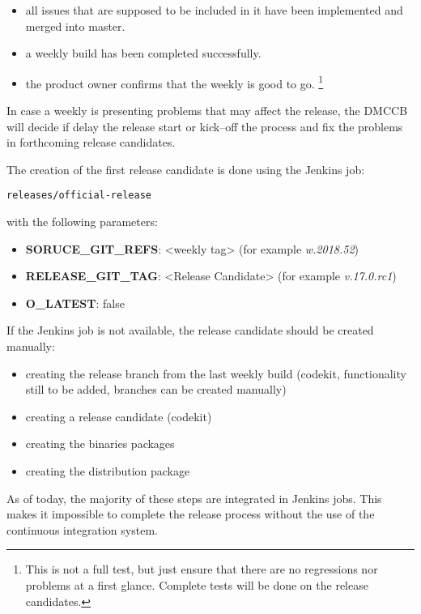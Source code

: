 \begin{itemize}
\item all issues that are supposed to be included in it have been implemented and merged into master.
\item a weekly build has been completed successfully.
\item the product owner confirms that the weekly is good to go. \footnote{This is not a full test, but just ensure that there are no regressions nor problems at a first glance. Complete tests will be done on the release candidates.}
\end{itemize}

In case a weekly is presenting problems that may affect the release, the DMCCB will decide if delay the release start or kick--off the process and fix the problems in forthcoming release candidates.

The creation of the first release candidate is done using the Jenkins job:

\begin{verbatim}
releases/official-release
\end{verbatim}

with the following parameters:

\begin{itemize}
\item {\bf SORUCE\_GIT\_REFS}: <weekly tag> (for example \textit{w.2018.52})
\item {\bf RELEASE\_GIT\_TAG}: <Release Candidate> (for example \textit{v.17.0.rc1})
\item {\bf O\_LATEST}: false
\end{itemize}


If the Jenkins job is not available, the release candidate should be created manually:

\begin{itemize}
\item creating the release branch from the last weekly build (codekit, functionality still to be added, branches can be created manually)
\item creating a release candidate (codekit)
\item creating the binaries packages
\item creating the distribution package
\end{itemize}

As of today, the majority of these steps are integrated in Jenkins jobs. This makes it impossible to complete the release process without the use of the continuous integration system.

